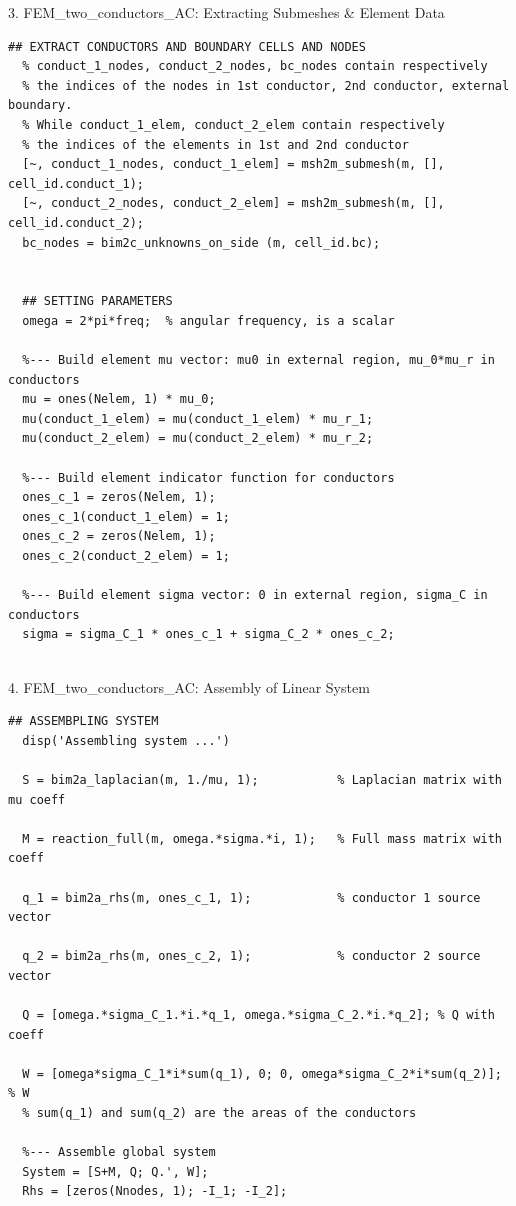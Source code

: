 \documentclass[aspectratio=54,xcolor=dvipsnames]{beamer}
\begin{document}
\begin{frame}[fragile]{3. FEM\_two\_conductors\_AC: Extracting Submeshes \& Element Data}
\scriptsize
\begin{lstlisting}[firstnumber=60]
  ## EXTRACT CONDUCTORS AND BOUNDARY CELLS AND NODES
  % conduct_1_nodes, conduct_2_nodes, bc_nodes contain respectively
  % the indices of the nodes in 1st conductor, 2nd conductor, external boundary.
  % While conduct_1_elem, conduct_2_elem contain respectively
  % the indices of the elements in 1st and 2nd conductor
  [~, conduct_1_nodes, conduct_1_elem] = msh2m_submesh(m, [], cell_id.conduct_1);
  [~, conduct_2_nodes, conduct_2_elem] = msh2m_submesh(m, [], cell_id.conduct_2);
  bc_nodes = bim2c_unknowns_on_side (m, cell_id.bc);


  ## SETTING PARAMETERS
  omega = 2*pi*freq;  % angular frequency, is a scalar

  %--- Build element mu vector: mu0 in external region, mu_0*mu_r in conductors
  mu = ones(Nelem, 1) * mu_0;
  mu(conduct_1_elem) = mu(conduct_1_elem) * mu_r_1;
  mu(conduct_2_elem) = mu(conduct_2_elem) * mu_r_2;

  %--- Build element indicator function for conductors
  ones_c_1 = zeros(Nelem, 1);
  ones_c_1(conduct_1_elem) = 1;
  ones_c_2 = zeros(Nelem, 1);
  ones_c_2(conduct_2_elem) = 1;

  %--- Build element sigma vector: 0 in external region, sigma_C in conductors
  sigma = sigma_C_1 * ones_c_1 + sigma_C_2 * ones_c_2;
  
\end{lstlisting}
\end{frame}

\begin{frame}[fragile]{4. FEM\_two\_conductors\_AC: Assembly of Linear System}
\scriptsize
\begin{lstlisting}[firstnumber=88]
  ## ASSEMBPLING SYSTEM
  disp('Assembling system ...')

  S = bim2a_laplacian(m, 1./mu, 1);           % Laplacian matrix with mu coeff

  M = reaction_full(m, omega.*sigma.*i, 1);   % Full mass matrix with coeff

  q_1 = bim2a_rhs(m, ones_c_1, 1);            % conductor 1 source vector

  q_2 = bim2a_rhs(m, ones_c_2, 1);            % conductor 2 source vector

  Q = [omega.*sigma_C_1.*i.*q_1, omega.*sigma_C_2.*i.*q_2]; % Q with coeff

  W = [omega*sigma_C_1*i*sum(q_1), 0; 0, omega*sigma_C_2*i*sum(q_2)]; % W
  % sum(q_1) and sum(q_2) are the areas of the conductors

  %--- Assemble global system
  System = [S+M, Q; Q.', W];
  Rhs = [zeros(Nnodes, 1); -I_1; -I_2];
  
\end{lstlisting}
\end{frame}
\end{document}
